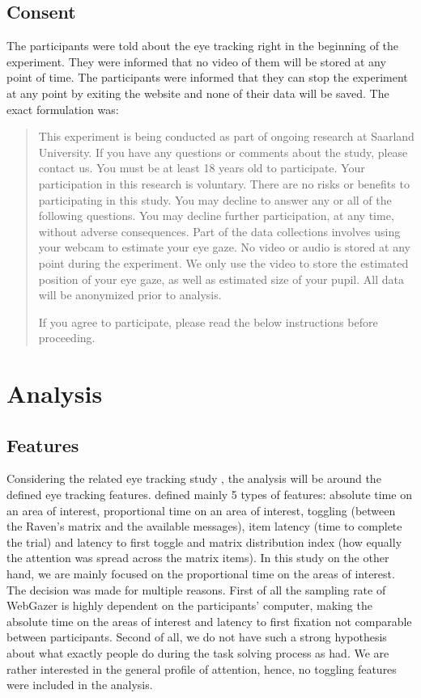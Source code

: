 \subsection{Consent}
The participants were told about the eye tracking right in the beginning of the experiment. They were informed that no video of them will be stored at any point of time. The participants were informed that they can stop the experiment at any point by exiting the website and none of their data will be saved. The exact formulation was: 

\begin{quote}
    This experiment is being conducted as part of ongoing research at Saarland University. If you have any questions or comments about the study, please contact us. You must be at least 18 years old to participate. Your participation in this research is voluntary. There are no risks or benefits to participating in this study. You may decline to answer any or all of the following questions. You may decline further participation, at any time, without adverse consequences. Part of the data collections involves using your webcam to estimate your eye gaze. No video or audio is stored at any point during the experiment. We only use the video to store the estimated position of your eye gaze, as well as estimated size of your pupil. All data will be anonymized prior to analysis. 

    If you agree to participate, please read the below instructions before proceeding.
\end{quote}


\section{Analysis}
\label{sec:analysis}

\subsection{Features}
\label{sec:analysis:features}
Considering the related eye tracking study \cite{Vigneau_2006}, the analysis will be around the defined eye tracking features. \cite{Vigneau_2006} defined mainly 5 types of features: absolute time on an area of interest, proportional time on an area of interest, toggling (between the Raven's matrix and the available messages), item latency (time to complete the trial) and latency to first toggle and matrix distribution index (how equally the attention was spread across the matrix items). In this study on the other hand, we are mainly focused on the proportional time on the areas of interest. The decision was made for multiple reasons. First of all the sampling rate of WebGazer is highly dependent on the participants' computer, making the absolute time on the areas of interest and latency to first fixation not comparable between participants. Second of all, we do not have such a strong hypothesis about what exactly people do during the task solving process as \cite{Vigneau_2006} had. We are rather interested in the general profile of attention, hence, no toggling features were included in the analysis. 

